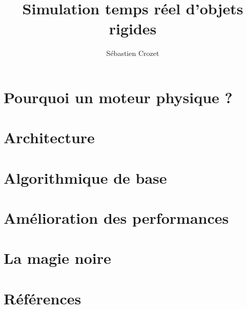 \documentclass{beamer}
\title{Simulation temps réel d'objets rigides}
\author{Sébastien Crozet}
\begin{document}
\maketitle

\section{Pourquoi un moteur physique ?}

\section{Architecture}

\section{Algorithmique de base}

\section{Amélioration des performances}

\section{La magie noire}

\section{Références}
\end{document}
